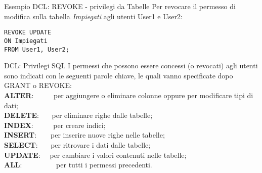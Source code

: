 %
\begin{frame}[fragile]{Esempio DCL: REVOKE - privilegi da Tabelle}
Per revocare il permesso di modifica sulla tabella \textit{Impiegati} agli utenti User1 e User2:
\begin{lstlisting}
REVOKE UPDATE
ON Impiegati
FROM User1, User2;
\end{lstlisting}
\end{frame}
%
\begin{frame}[fragile]{DCL: Privilegi SQL}
I permessi che possono essere concessi (o revocati) agli utenti sono indicati con le seguenti parole chiave, le quali vanno specificate dopo GRANT o REVOKE:
\newline
\\\textbf{ALTER}:~~~~~ per aggiungere o eliminare colonne oppure per modificare tipi di dati;
\\\textbf{DELETE}:~~~ per eliminare righe dalle tabelle;
\\\textbf{INDEX}:~~~~~ per creare indici;
\\\textbf{INSERT}:~~~~per inserire nuove righe nelle tabelle;
\\\textbf{SELECT}:~~~ per ritrovare i dati  dalle tabelle;
\\\textbf{UPDATE}:~~ per cambiare i valori contenuti nelle tabelle;
\\\textbf{ALL}:~~~~~~~~~ per tutti i permessi precedenti.
\end{frame}